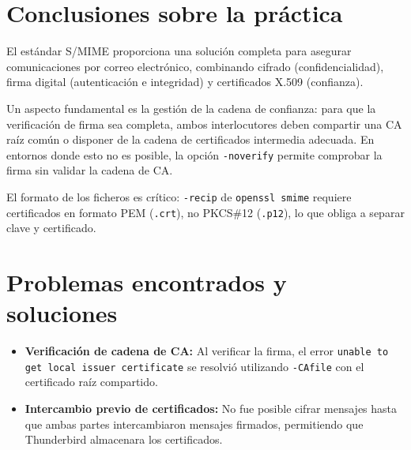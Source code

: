 \documentclass[12pt,a4paper]{report}
\begin{document}
\section{Conclusiones sobre la práctica}

El estándar S/MIME proporciona una solución completa para asegurar comunicaciones por correo electrónico, 
combinando cifrado (confidencialidad), firma digital (autenticación e integridad) y certificados X.509 (confianza).

Un aspecto fundamental es la gestión de la cadena de confianza: para que la verificación de firma sea completa, 
ambos interlocutores deben compartir una CA raíz común o disponer de la cadena de certificados intermedia adecuada. 
En entornos donde esto no es posible, la opción \texttt{-noverify} permite comprobar la firma sin validar la cadena de CA.

El formato de los ficheros es crítico: \texttt{-recip} de \texttt{openssl smime} requiere certificados en formato 
PEM (\texttt{.crt}), no PKCS\#12 (\texttt{.p12}), lo que obliga a separar clave y certificado.

\section{Problemas encontrados y soluciones}

\begin{itemize}[label=\textbullet]
    \item \textbf{Verificación de cadena de CA:} Al verificar la firma, el error \texttt{unable to get local issuer certificate} se resolvió utilizando \texttt{-CAfile} con el certificado raíz compartido.
    \item \textbf{Intercambio previo de certificados:} No fue posible cifrar mensajes hasta que ambas partes intercambiaron mensajes firmados, permitiendo que Thunderbird almacenara los certificados.
\end{itemize}

\end{document}
